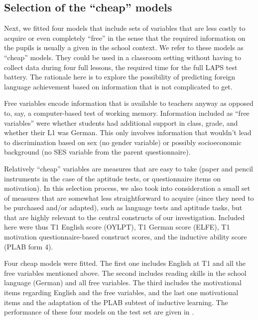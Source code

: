 \documentclass[output=paper]{langsci/langscibook}
\begin{document}
\subsection{Selection of the ``cheap'' models}

Next, we fitted four models that include sets of variables that are less costly to acquire or even completely ``free'' in the sense that the required information on the pupils is usually a given in the school context. We refer to these models as ``cheap'' models. They could be used in a classroom setting without having to collect data during four full lessons, the required time for the full LAPS test battery. The rationale here is to explore the possibility of predicting foreign language achievement based on information that is not complicated to get. 

Free variables encode information that is available to teachers anyway as opposed to, say, a computer-based test of working memory. Information included as “free variables” were whether students had additional support in class, grade, and whether their L1 was German. This only involves information that wouldn’t lead to discrimination based on sex (no gender variable) or possibly socioeconomic background (no SES variable from the parent questionnaire). 

Relatively ``cheap'' variables are measures that are easy to take (paper and pencil instruments in the case of the aptitude tests, or questionnaire items on motivation). In this selection process, we also took into consideration a small set of measures that are somewhat less straightforward to acquire (since they need to be purchased and/or adapted), such as language tests and aptitude tasks, but that are highly relevant to the central constructs of our investigation. Included here were thus T1 English score (OYLPT), T1 German score (ELFE), T1 motivation questionnaire-based construct scores, and the inductive ability score (PLAB form 4).

Four cheap models were fitted. The first one includes English at T1 and all the free variables mentioned above. The second includes reading skills in the school language (German) and all free variables. The third includes the motivational items regarding English and the free variables, and the last one motivational items and the adaptation of the PLAB subtest of inductive learning. The performance of these four models on the test set are given in . 
\end{document}
